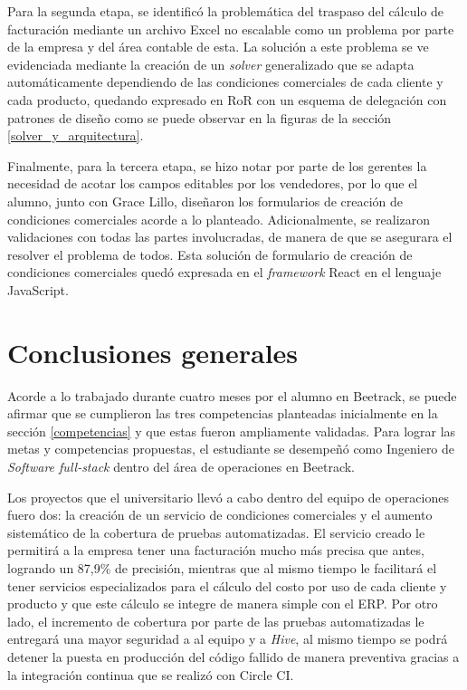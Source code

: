 \begin{enumerate}
    Para la segunda etapa, se identificó la problemática del traspaso del cálculo de facturación mediante un archivo Excel no escalable como un problema por parte de la empresa y del área contable de esta. La solución a este problema se ve evidenciada mediante la creación de un \textit{solver} generalizado que se adapta automáticamente dependiendo de las condiciones comerciales de cada cliente y cada producto, quedando expresado en RoR con un esquema de delegación con patrones de diseño como se puede observar en la figuras de la sección \ref{solver_y_arquitectura}.

    Finalmente, para la tercera etapa, se hizo notar por parte de los gerentes la necesidad de acotar los campos editables por los vendedores, por lo que el alumno, junto con Grace Lillo, diseñaron los formularios de creación de condiciones comerciales acorde a lo planteado. Adicionalmente, se realizaron validaciones con todas las partes involucradas, de manera de que se asegurara el resolver el problema de todos. Esta solución de formulario de creación de condiciones comerciales quedó expresada en el \textit{framework} React en el lenguaje JavaScript.

  \end{enumerate}

\section{Conclusiones generales}

  Acorde a lo trabajado durante cuatro meses por el alumno en Beetrack, se puede afirmar que se cumplieron las tres competencias planteadas inicialmente en la sección \ref{competencias} y que estas fueron ampliamente validadas. Para lograr las metas y competencias propuestas, el estudiante se desempeñó como Ingeniero de \textit{Software full-stack} dentro del área de operaciones en Beetrack.
  
  Los proyectos que el universitario llevó a cabo dentro del equipo de operaciones fuero dos: la creación de un servicio de condiciones comerciales  y el aumento sistemático de la cobertura de pruebas automatizadas. El servicio creado le permitirá a la empresa tener una facturación mucho más precisa que antes, logrando un 87,9\% de precisión, mientras que al mismo tiempo le facilitará el tener servicios especializados para el cálculo del costo por uso de cada cliente y producto y que este cálculo se integre de manera simple con el ERP. Por otro lado, el incremento de cobertura por parte de las pruebas automatizadas le entregará una mayor seguridad a al equipo y a \textit{Hive}, al mismo tiempo se podrá detener la puesta en producción del código fallido de manera preventiva gracias a la integración continua que se realizó con Circle CI.

